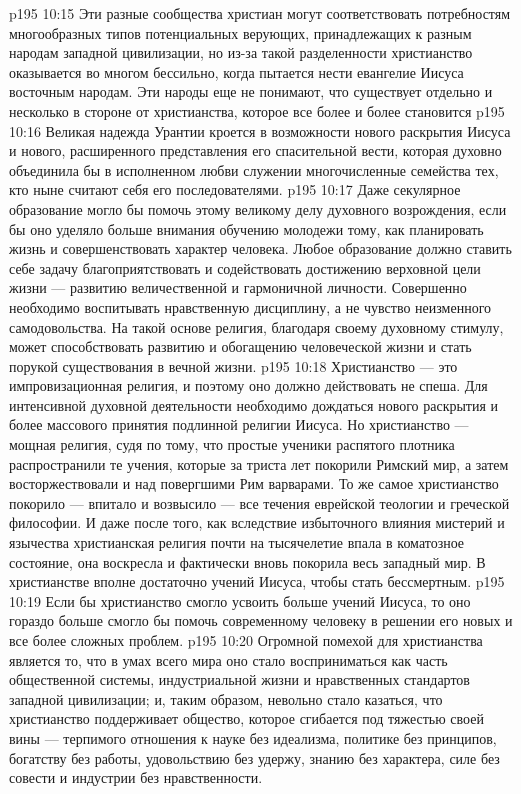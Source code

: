 \vs p195 10:15 Эти разные сообщества христиан могут соответствовать потребностям многообразных типов потенциальных верующих, принадлежащих к разным народам западной цивилизации, но из\hyp{}за такой разделенности христианство оказывается во многом бессильно, когда пытается нести евангелие Иисуса восточным народам. Эти народы еще не понимают, что существует  отдельно и несколько в стороне от христианства, которое все более и более становится 
\vs p195 10:16 Великая надежда Урантии кроется в возможности нового раскрытия Иисуса и нового, расширенного представления его спасительной вести, которая духовно объединила бы в исполненном любви служении многочисленные семейства тех, кто ныне считают себя его последователями.
\vs p195 10:17 Даже секулярное образование могло бы помочь этому великому делу духовного возрождения, если бы оно уделяло больше внимания обучению молодежи тому, как планировать жизнь и совершенствовать характер человека. Любое образование должно ставить себе задачу благоприятствовать и содействовать достижению верховной цели жизни --- развитию величественной и гармоничной личности. Совершенно необходимо воспитывать нравственную дисциплину, а не чувство неизменного самодовольства. На такой основе религия, благодаря своему духовному стимулу, может способствовать развитию и обогащению человеческой жизни и стать порукой существования в вечной жизни.
\vs p195 10:18 Христианство --- это импровизационная религия, и поэтому оно должно действовать не спеша. Для интенсивной духовной деятельности необходимо дождаться нового раскрытия и более массового принятия подлинной религии Иисуса. Но христианство --- мощная религия, судя по тому, что простые ученики распятого плотника распространили те учения, которые за триста лет покорили Римский мир, а затем восторжествовали и над повергшими Рим варварами. То же самое христианство покорило --- впитало и возвысило --- все течения еврейской теологии и греческой философии. И даже после того, как вследствие избыточного влияния мистерий и язычества христианская религия почти на тысячелетие впала в коматозное состояние, она воскресла и фактически вновь покорила весь западный мир. В христианстве вполне достаточно учений Иисуса, чтобы стать бессмертным.
\vs p195 10:19 Если бы христианство смогло усвоить больше учений Иисуса, то оно гораздо больше смогло бы помочь современному человеку в решении его новых и все более сложных проблем.
\vs p195 10:20 Огромной помехой для христианства является то, что в умах всего мира оно стало восприниматься как часть общественной системы, индустриальной жизни и нравственных стандартов западной цивилизации; и, таким образом, невольно стало казаться, что христианство поддерживает общество, которое сгибается под тяжестью своей вины --- терпимого отношения к науке без идеализма, политике без принципов, богатству без работы, удовольствию без удержу, знанию без характера, силе без совести и индустрии без нравственности.
